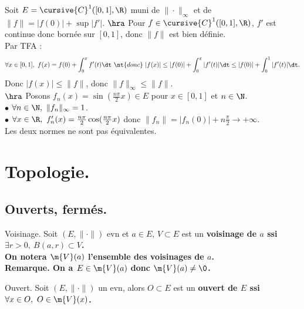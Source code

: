 \documentclass[11pt]{article}
\begin{document}
\vspace*{-0.7cm}

\begin{exi}{}{}
    Soit $E=\cursive{C}^1([0,1],\R)$ muni de $\|\cdot\|_\infty$ et de $\|f\|=|f(0)|+\sup|f'|$.
    \tcblower
    $\hra$ Pour $f\in\cursive{C}^1([0,1],\R)$, $f'$ est continue donc bornée sur $[0,1]$, donc $\|f\|$ est bien définie.\\
    Par TFA :
    \begin{equation*}
        \forall x \in [0,1], ~ f(x) = f(0) + \int_0^xf'(t)\dt ~\nt{donc}~ |f(x)|\leq|f(0)|+\int_0^x|f'(t)|\dt\leq|f(0)|+\int_0^1|f'(t)|\dt.
    \end{equation*}
    Donc $|f(x)|\leq\|f\|$, donc $\|f\|_{\infty} \leq \|f\|$.\\
    $\hra$ Posons $f_n(x)=\sin(\frac{n\pi}{2}x)\in E$ pour $x\in[0,1]$ et $n\in\N$.\\
    $\bullet$ $\forall n \in \N, ~ \|f_n\|_{\infty}=1$.\\
    $\bullet$ $\forall x \in \R, ~ f_n'(x) = \frac{n\pi}{2}\cos(\frac{n\pi}{2}x)$ donc $\|f_n\|=|f_n(0)|+n\frac{\pi}{2}\to+\infty$.\\
    Les deux normes ne sont pas équivalentes.
\end{exi}

\section{Topologie.}

\subsection{Ouverts, fermés.}

\begin{defi}{Voisinage.}{}
    Soit $(E,\|\cdot\|)$ evn et $a\in E$, $V\subset E$ est un \bf{voisinage} de $a$ ssi $\exists r > 0, ~ B(a,r)\subset V$.\\
    On notera $\m{V}(a)$ l'ensemble des voisinages de $a$.\\
    \bf{Remarque.} On a $E\in\m{V}(a)$ donc $\m{V}(a)\neq\0$.
\end{defi}

\vspace*{-0.8cm}

\begin{defi}{Ouvert.}{}
    Soit $(E,\|\cdot\|)$ un evn, alors $O\subset E$ est un \bf{ouvert} de $E$ ssi $\forall x \in O, ~ O\in\m{V}(x)$.
\end{defi}
\end{document}
